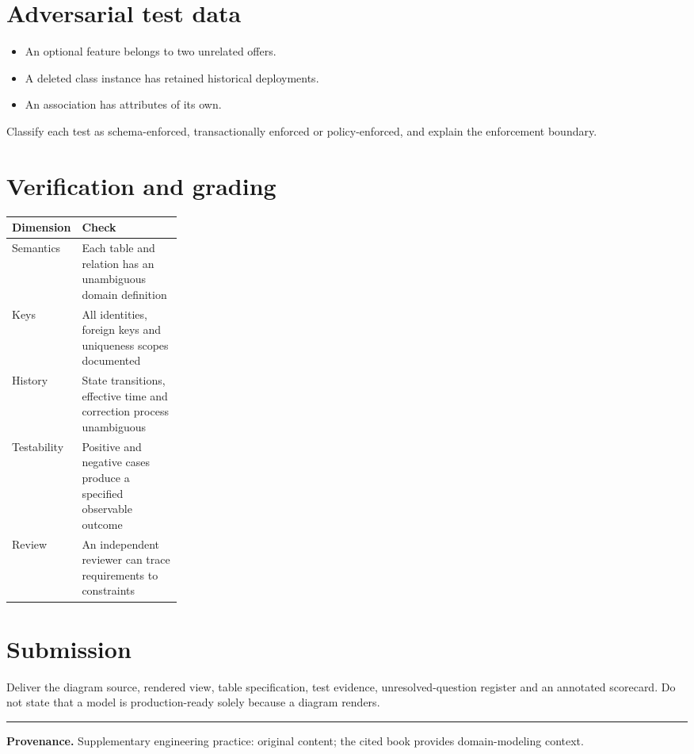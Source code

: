 \documentclass[11pt,letterpaper]{article}
\begin{document}
\section{Adversarial test data}
\begin{itemize}
\item An optional feature belongs to two unrelated offers.
\item A deleted class instance has retained historical deployments.
\item An association has attributes of its own.
\end{itemize}
Classify each test as schema-enforced, transactionally enforced or policy-enforced, and explain the enforcement boundary.


\section{Verification and grading}
\begin{tabularx}{\linewidth}{@{}>{\raggedright\arraybackslash}p{0.25\linewidth}>{\raggedright\arraybackslash}X@{}}
\toprule
\textbf{Dimension} & \textbf{Check} \\ 
\midrule
Semantics & Each table and relation has an unambiguous domain definition \\ 
Keys & All identities, foreign keys and uniqueness scopes documented \\ 
History & State transitions, effective time and correction process unambiguous \\ 
Testability & Positive and negative cases produce a specified observable outcome \\ 
Review & An independent reviewer can trace requirements to constraints \\ 
\bottomrule
\end{tabularx}

\section{Submission}
Deliver the diagram source, rendered view, table specification, test evidence, unresolved-question register and an annotated scorecard. Do not state that a model is production-ready solely because a diagram renders.


\vfill
\hrule
{\footnotesize\textbf{Provenance.} Supplementary engineering practice: original content; the cited book provides domain-modeling context.}
\end{document}
